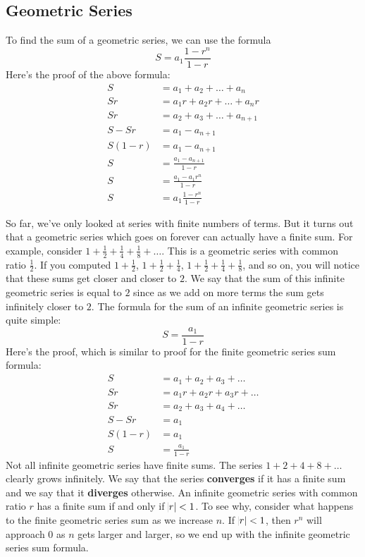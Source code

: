 \documentclass{article}
\begin{document}
    \subsection*{Geometric Series}
    To find the sum of a geometric series, we can use the formula
    \[S = a_1 \frac{1 - r^n}{1 - r}\] Here's the proof of the above formula:
    \begin{align*}
        S &= a_1 + a_2 + \dots + a_n \\
        Sr &= a_1 r + a_2 r + \dots + a_n r \\
        Sr &= a_2 + a_3 + \dots + a_{n + 1} \\
        S - Sr &= a_1 - a_{n + 1} \\
        S(1 - r) &= a_1 - a_{n + 1} \\
        S &= \frac{a_1 - a_{n + 1}}{1 - r} \\
        S &= \frac{a_1 - a_1 r^n}{1 - r} \\
        S &= a_1 \frac{1 - r^n}{1 - r}
    \end{align*}

    So far, we've only looked at series with finite numbers of terms. But it
    turns out that a geometric series which goes on forever can actually have a
    finite sum. For example, consider $1 + \frac{1}{2} + \frac{1}{4} +
    \frac{1}{8} + \dots$. This is a geometric series with common ratio
    $\frac{1}{2}$. If you computed $1 + \frac{1}{2}$, $1 + \frac{1}{2} +
    \frac{1}{4}$, $1 + \frac{1}{2} + \frac{1}{4} + \frac{1}{8}$, and so on, you
    will notice that these sums get closer and closer to $2$. We say that the
    sum of this infinite geometric series is equal to $2$ since as we add on
    more terms the sum gets infinitely closer to $2$. The formula for the sum of
    an infinite geometric series is quite simple:
    \[S = \frac{a_1}{1 - r}\] Here's the proof, which is similar to proof for
    the finite geometric series sum formula:
    \begin{align*}
        S &= a_1 + a_2 + a_3 + \dots \\
        Sr &= a_1 r + a_2 r + a_3 r + \dots \\
        Sr &= a_2 + a_3 + a_4 + \dots \\
        S - Sr &= a_1 \\
        S(1 - r) &= a_1 \\
        S &= \frac{a_1}{1 - r}
    \end{align*}
    Not all infinite geometric series have finite sums. The series $1 + 2 + 4 +
    8 + \dots$ clearly grows infinitely. We say that the series
    \textbf{converges} if it has a finite sum and we say that it
    \textbf{diverges} otherwise. An infinite geometric series with common ratio
    $r$ has a finite sum if and only if $\abs{r} < 1$. To see why, consider what
    happens to the finite geometric series sum as we increase $n$. If $\abs{r} <
    1$, then $r^n$ will approach $0$ as $n$ gets larger and larger, so we end up
    with the infinite geometric series sum formula.
\end{document}
